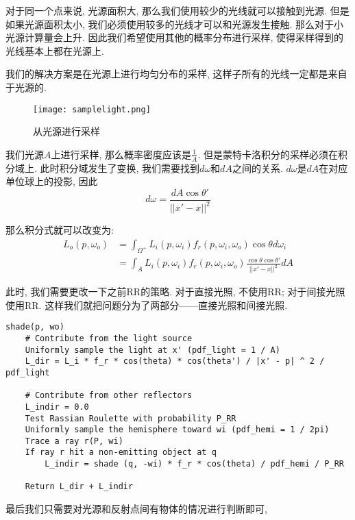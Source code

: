 \documentclass[openany]{progbookcn}
\begin{document}
对于同一个点来说, 光源面积大, 那么我们使用较少的光线就可以接触到光源. 但是如果光源面积太小, 我们必须使用较多的光线才可以和光源发生接触. 那么对于小光源计算量会上升. 因此我们希望使用其他的概率分布进行采样, 使得采样得到的光线基本上都在光源上. 

我们的解决方案是在光源上进行均匀分布的采样, 这样子所有的光线一定都是来自于光源的. 

\begin{figure}[H]
	\centering
	\texttt{[image: samplelight.png]}
	\caption{从光源进行采样}
	\label{fig:samplelight}
\end{figure}

我们光源$A$上进行采样, 那么概率密度应该是$\frac{1}{A}$. 但是蒙特卡洛积分的采样必须在积分域上. 此时积分域发生了变换, 我们需要找到$d\omega$和$dA$之间的关系. $d\omega$是$dA$在对应单位球上的投影, 因此
\begin{equation}
	d\omega = \frac{dA\cos\theta'}{||x'-x||^2}
\end{equation}

那么积分式就可以改变为: 
\begin{equation}
	\begin{split}
		L_o(p,\omega_o)&=\int_{\Omega^+}L_i(p,\omega_i)f_r(p,\omega_i,\omega_o)\cos\theta d\omega_i\\
		&=\int_AL_i(p,\omega_i)f_r(p,\omega_i,\omega_o)\frac{\cos\theta\cos\theta'}{||x'-x||^2}dA
	\end{split}
\end{equation}

此时, 我们需要更改一下之前RR的策略. 对于直接光照, 不使用RR; 对于间接光照使用RR. 这样我们就把问题分为了两部分——直接光照和间接光照. 

\begin{lstlisting}[caption=采用光源上均匀分布渲染函数伪代码]
shade(p, wo)
	# Contribute from the light source
	Uniformly sample the light at x' (pdf_light = 1 / A)
	L_dir = L_i * f_r * cos(theta) * cos(theta') / |x' - p| ^ 2 / pdf_light
	
	# Contribute from other reflectors
	L_indir = 0.0
	Test Rassian Roulette with probability P_RR
	Uniformly sample the hemisphere toward wi (pdf_hemi = 1 / 2pi)
	Trace a ray r(P, wi)
	If ray r hit a non-emitting object at q
		L_indir = shade (q, -wi) * f_r * cos(theta) / pdf_hemi / P_RR
	
	Return L_dir + L_indir
\end{lstlisting}

最后我们只需要对光源和反射点间有物体的情况进行判断即可, 
\end{document}
